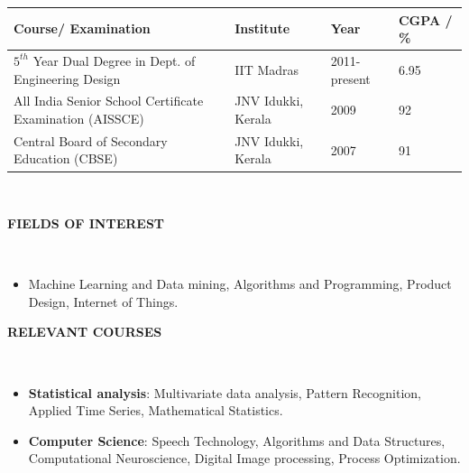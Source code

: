 \documentclass[a4paper,10pt]{article}
\newcommand{\lsep}{-0.5cm}
\newcommand{\resheading}[1]{{\small \colorbox{mygrey}{\begin{minipage}{0.975\textwidth}{\textbf{#1 \vphantom{p\^{E}}}}\end{minipage}}}}
\begin{document}
    \indent \begin{tabularx}{0.97\textwidth}{ X  p{3.4cm}  p{2.3cm} p{2cm} }
    \hline
    \textbf{Course/ Examination} & \textbf{Institute} & \textbf{Year} & \textbf{CGPA / \%} \\
    \hline
    $5^{th}$ Year Dual Degree in Dept. of Engineering Design & IIT Madras & 2011-present & 6.95\\
    All India Senior School Certificate Examination (AISSCE) & JNV Idukki, Kerala & 2009 & 92\\
    Central Board of Secondary Education (CBSE) & JNV Idukki, Kerala & 2007 & 91\\
    \hline
    \end{tabularx}
    \\


\resheading{\textbf{FIELDS OF INTEREST} }\\[\lsep]
    \begin{itemize}
        \item \noindent Machine Learning and Data mining, Algorithms and Programming, Product Design, Internet of Things.
    \end{itemize}

\resheading{\textbf{RELEVANT COURSES} }\\[\lsep]
\begin{itemize}
    \item \textbf{Statistical analysis}: Multivariate data analysis, Pattern Recognition, Applied Time Series, Mathematical Statistics.
    \vspace{-5pt}
    \item \textbf{Computer Science}: Speech Technology, Algorithms and Data Structures, Computational Neuroscience, Digital Image processing, Process Optimization.
    \vspace{-5pt}
\end{itemize}
\end{document}

